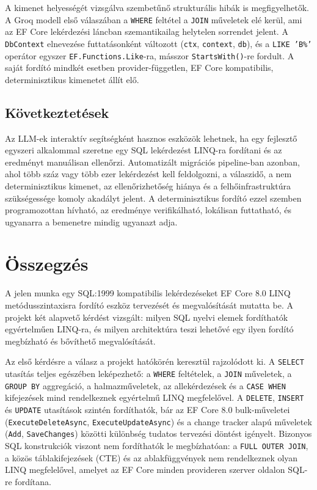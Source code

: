 \documentclass[a4paper,12pt]{article}
\begin{document}
A kimenet helyességét vizsgálva szembetűnő strukturális hibák is megfigyelhetők. A Groq modell első válaszában a \texttt{WHERE} feltétel a \texttt{JOIN} műveletek elé kerül, ami az EF Core lekérdezési láncban szemantikailag helytelen sorrendet jelent. A \texttt{DbContext} elnevezése futtatásonként változott (\texttt{ctx}, \texttt{context}, \texttt{db}), és a \texttt{LIKE 'B\%'} operátor egyszer \texttt{EF.Functions.Like}-ra, másszor \texttt{StartsWith()}-re fordult. A saját fordító mindkét esetben provider-független, EF Core kompatibilis, determinisztikus kimenetet állít elő.

\subsection{Következtetések}

Az LLM-ek interaktív segítségként hasznos eszközök lehetnek, ha egy fejlesztő egyszeri alkalommal szeretne egy SQL lekérdezést LINQ-ra fordítani és az eredményt manuálisan ellenőrzi. Automatizált migrációs pipeline-ban azonban, ahol több száz vagy több ezer lekérdezést kell feldolgozni, a válaszidő, a nem determinisztikus kimenet, az ellenőrizhetőség hiánya és a felhőinfrastruktúra szükségessége komoly akadályt jelent. A determinisztikus fordító ezzel szemben programozottan hívható, az eredménye verifikálható, lokálisan futtatható, és ugyanarra a bemenetre mindig ugyanazt adja.

\section{Összegzés}

A jelen munka egy SQL:1999 kompatibilis lekérdezéseket EF Core 8.0 LINQ metódusszintaxisra fordító eszköz tervezését és megvalósítását mutatta be. A projekt két alapvető kérdést vizsgált: milyen SQL nyelvi elemek fordíthatók egyértelműen LINQ-ra, és milyen architektúra teszi lehetővé egy ilyen fordító megbízható és bővíthető megvalósítását.

Az első kérdésre a válasz a projekt hatókörén keresztül rajzolódott ki. A \texttt{SELECT} utasítás teljes egészében leképezhető: a \texttt{WHERE} feltételek, a \texttt{JOIN} műveletek, a \texttt{GROUP BY} aggregáció, a halmazműveletek, az allekérdezések és a \texttt{CASE WHEN} kifejezések mind rendelkeznek egyértelmű LINQ megfelelővel. A \texttt{DELETE}, \texttt{INSERT} és \texttt{UPDATE} utasítások szintén fordíthatók, bár az EF Core 8.0 bulk-műveletei (\texttt{ExecuteDeleteAsync}, \texttt{ExecuteUpdateAsync}) és a change tracker alapú műveletek (\texttt{Add}, \texttt{SaveChanges}) közötti különbség tudatos tervezési döntést igényelt. Bizonyos SQL konstrukciók viszont nem fordíthatók le megbízhatóan: a \texttt{FULL OUTER JOIN}, a közös táblakifejezések (CTE) és az ablakfüggvények nem rendelkeznek olyan LINQ megfelelővel, amelyet az EF Core minden provideren szerver oldalon SQL-re fordítana.
\end{document}
